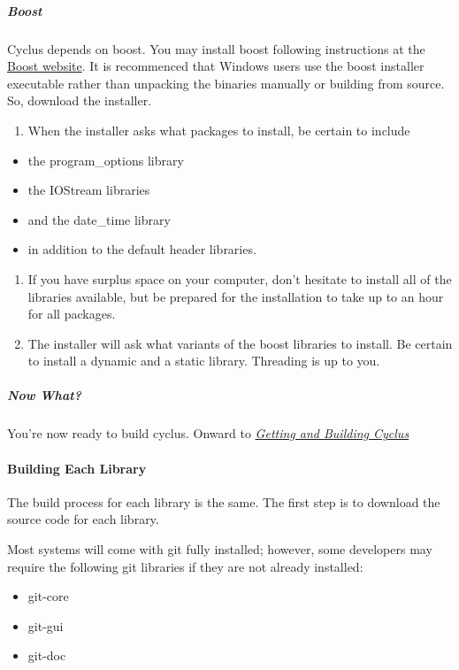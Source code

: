 \documentclass[letterpaper,10pt,english]{sphinxmanual}
\begin{document}
\subparagraph{Boost}
\label{devdoc/dependencies_windows:boost}
Cyclus depends on boost. You may install boost following instructions at the
\href{http://www.boost.org}{Boost website}.  It is recommenced that Windows users use the boost installer
executable rather than unpacking the binaries manually or building from source.
So, download the installer.
\begin{enumerate}
\item {} 
When the installer asks what packages to install, be certain to include

\end{enumerate}
\begin{itemize}
\item {} 
the program\_options library

\item {} 
the IOStream libraries

\item {} 
and the date\_time library

\item {} 
in addition to the default header libraries.

\end{itemize}
\begin{enumerate}
\item {} 
If you have surplus space on your computer, don't hesitate to install all of
the libraries available, but be prepared for the installation to take up to an
hour for all packages.

\item {} 
The installer will ask what variants of the boost libraries to install. Be
certain to install a dynamic and a static library. Threading is up to you.

\end{enumerate}


\subparagraph{Now What?}
\label{devdoc/dependencies_windows:now-what}
You're now ready to build cyclus. Onward to {\hyperref[devdoc/get_and_build::doc]{\emph{Getting and Building Cyclus}}}


\paragraph{Building Each Library}
\label{devdoc/get_and_build:building-each-library}
The build process for each library is the same. The first step is to
download the source code for each library.

Most systems will come with git fully installed; however, some developers may
require the following git libraries if they are not already installed:
\begin{itemize}
\item {} 
git-core

\item {} 
git-gui

\item {} 
git-doc

\end{itemize}
\end{document}
